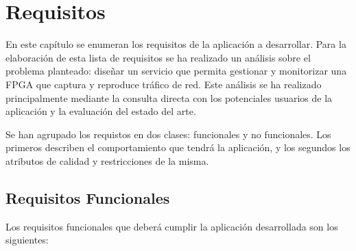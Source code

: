 \chapter{Requisitos\label{cap:requisitos}}

En este capítulo se enumeran los requisitos de la aplicación a desarrollar. Para la elaboración de esta lista de requisitos se ha realizado un análisis sobre el problema planteado: diseñar un servicio que permita gestionar y monitorizar una \gls{FPGA} que captura y reproduce tráfico de red.
Este análisis se ha realizado principalmente mediante la consulta directa con los potenciales usuarios de la aplicación y la evaluación del estado del arte.

Se han agrupado los requistos en dos clases: funcionales y no funcionales.
Los primeros describen el comportamiento que tendrá la aplicación, y los segundos los atributos de calidad y restricciones de la misma.


\section{Requisitos Funcionales\label{sec:req:rf}}

Los requisitos funcionales que deberá cumplir la aplicación desarrollada son los siguientes:

